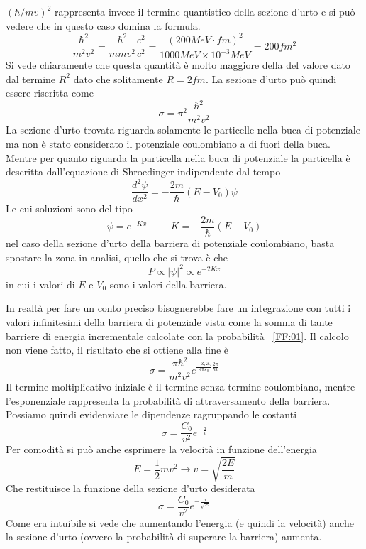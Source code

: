 $(\hbar/mv)^2$ rappresenta invece il termine quantistico della sezione d'urto e si può vedere che in questo caso domina la formula.
\begin{equation}
\frac{\hbar^2}{m^2v^2}=\frac{\hbar^2}{mmv^2}\frac{c^2}{c^2}=\frac{(200MeV\cdot fm)^2}{1000MeV\times 10^{-3}MeV}=200fm^2
\end{equation}
Si vede chiaramente che questa quantità è molto maggiore della del valore dato dal termine $R^2$ dato che solitamente $R=2fm$.
La sezione d'urto può quindi essere riscritta come 
\begin{equation}
\sigma=\pi^2\frac{\hbar^2}{m^2v^2}
\end{equation}
La sezione d'urto trovata riguarda solamente le particelle nella buca di potenziale ma non è stato considerato il potenziale coulombiano a di fuori della buca.
Mentre per quanto riguarda la particella nella buca di potenziale la particella è descritta dall'equazione di Shroedinger indipendente dal tempo 
\begin{equation}
\frac{d^2\psi}{dx^2}=-\frac{2m}{\hbar}(E-V_0)\psi
\end{equation}
Le cui soluzioni sono del tipo
\begin{equation}
\psi=e^{-Kx}\hspace{1cm} K=-\frac{2m}{\hbar}(E-V_0)
\end{equation}
nel caso della sezione d'urto della barriera di potenziale coulombiano, basta spostare la zona in analisi, quello che si trova è che 
\begin{equation}
P\propto |\psi|^2\propto e^{-2Kx}
\label{FF:01}
\end{equation}
in cui i valori di $E$ e $V_0$ sono i valori della barriera.

In realtà per fare un conto preciso bisognerebbe fare un integrazione con tutti i valori infinitesimi della barriera di potenziale vista come la somma di tante barriere di energia incrementale calcolate con la probabilità ~\eqref{FF:01}.
Il calcolo non viene fatto, il risultato che si ottiene alla fine è
\begin{equation}
\sigma=\frac{\pi \hbar^2}{m^2v^2}e^{\frac{-Z_1Z_2}{4\pi \varepsilon_0}\frac{2\pi}{\hbar v}}
\end{equation}
Il termine moltiplicativo iniziale è il termine senza termine coulombiano, mentre l'esponenziale rappresenta la probabilità di attraversamento della barriera.
Possiamo quindi evidenziare le dipendenze ragruppando le costanti
\begin{equation}
\sigma=\frac{C_0}{v^2}e^{-\frac{a}{v}}
\end{equation}
Per comodità si può anche esprimere la velocità in funzione dell'energia
\begin{equation}
E=\frac{1}{2}mv^2\to v=\sqrt{\frac{2E}{m}}
\end{equation}
Che restituisce la funzione della sezione d'urto desiderata
\begin{equation}
\sigma=\frac{C_0}{v^2}e^{-\frac{a}{\sqrt{E}}}
\end{equation}
Come era intuibile si vede che aumentando l'energia (e quindi la velocità) anche la sezione d'urto (ovvero la probabilità di superare la barriera) aumenta.

